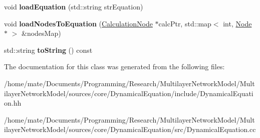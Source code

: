 \begin{DoxyCompactItemize}
\item 
void {\bfseries load\+Equation} (std\+::string str\+Equation)\hypertarget{classDynamicalEquation_aabe35a0aca2762081bd3b880f1648a87}{}\label{classDynamicalEquation_aabe35a0aca2762081bd3b880f1648a87}

\item 
void {\bfseries load\+Nodes\+To\+Equation} (\hyperlink{classCalculationNode}{Calculation\+Node} $\ast$calc\+Ptr, std\+::map$<$ int, \hyperlink{classNode}{Node} $\ast$ $>$ \&nodes\+Map)\hypertarget{classDynamicalEquation_a2c54698f5a05199a87ff0650836ff95c}{}\label{classDynamicalEquation_a2c54698f5a05199a87ff0650836ff95c}

\item 
std\+::string {\bfseries to\+String} () const \hypertarget{classDynamicalEquation_aed67e4c29392eb9c616b64acaa7500bc}{}\label{classDynamicalEquation_aed67e4c29392eb9c616b64acaa7500bc}

\end{DoxyCompactItemize}


The documentation for this class was generated from the following files\+:\begin{DoxyCompactItemize}
\item 
/home/mate/\+Documents/\+Programming/\+Research/\+Multilayer\+Network\+Model/\+Multilayer\+Network\+Model/sources/core/\+Dynamical\+Equation/include/Dynamical\+Equation.\+hh\item 
/home/mate/\+Documents/\+Programming/\+Research/\+Multilayer\+Network\+Model/\+Multilayer\+Network\+Model/sources/core/\+Dynamical\+Equation/src/Dynamical\+Equation.\+cc\end{DoxyCompactItemize}
